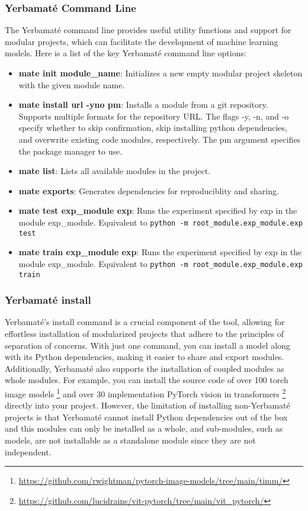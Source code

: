 \subsubsection{Yerbamaté Command Line}
The Yerbamaté command line provides useful utility functions and support for modular projects, which can facilitate the development of machine learning models.
Here is a list of the key Yerbamaté command line options:

\begin{itemize}
\item \textbf{mate init module\_name}: Initializes a new empty modular project skeleton with the given module name. 

\item \textbf{mate install url -y\textbar n\textbar o pm}: Installs a module from a git repository. Supports multiple formats for the repository URL. The flags -y, -n, and -o specify whether to skip confirmation, skip installing python dependencies, and overwrite existing code modules, respectively. The pm argument specifies the package manager to use.
\item \textbf{mate list}: Lists all available modules in the project. 
\item \textbf{mate exports}: Generates dependencies for reproduciblity and sharing.
\item \textbf{mate test exp\_module exp}: Runs the experiment specified by exp in the module exp\_module. Equivalent to \texttt{python -m root\_module.exp\_module.exp test}
\item \textbf{mate train exp\_module exp}: Runs the experiment specified by exp in the module exp\_module. Equivalent to \texttt{python -m root\_module.exp\_module.exp train}
\end{itemize}


\subsubsection{Yerbamaté install}
Yerbamaté's install command is a crucial component of the tool, allowing for effortless installation of modularized projects that adhere to the principles of separation of concerns. With just one command, you can install a model along with its Python dependencies, making it easier to share and export modules. Additionally, Yerbamaté also supports the installation of coupled modules as whole modules. For example, you can install the source code of over 100 torch image models \footnote{\url{https://github.com/rwightman/pytorch-image-models/tree/main/timm/}} and over 30 implementation PyTorch vision in transformers \footnote{\url{https://github.com/lucidrains/vit-pytorch/tree/main/vit\_pytorch/}} directly into your project. However, the limitation of installing non-Yerbamaté projects is that Yerbamaté cannot install Python dependencies out of the box and this modules can only be installed as a whole, and sub-modules, such as models, are not installable as a standalone module since they are not independent.

